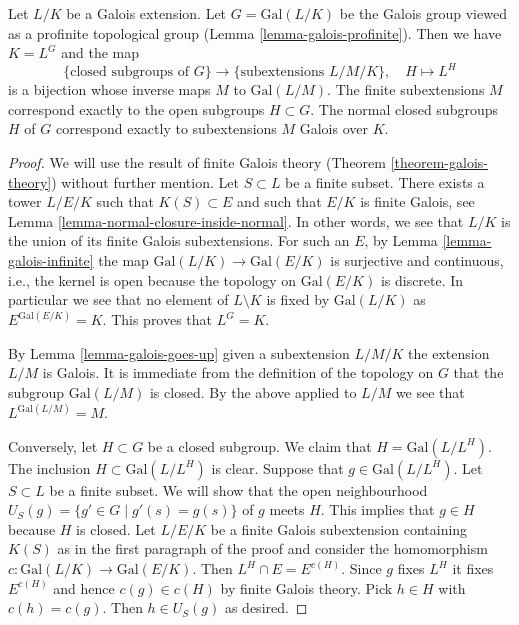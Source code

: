 \begin{theorem}
\label{theorem-inifinite-galois-theory}
Let $L/K$ be a Galois extension. Let $G = \text{Gal}(L/K)$
be the Galois group viewed as a profinite topological group
(Lemma \ref{lemma-galois-profinite}). Then we have $K = L^G$ and the map
$$
\{\text{closed subgroups of }G\}
\longrightarrow
\{\text{subextensions }L/M/K\},\quad
H \longmapsto L^H
$$
is a bijection whose inverse maps $M$ to $\text{Gal}(L/M)$.
The finite subextensions $M$ correspond exactly to the open
subgroups $H \subset G$. The normal closed subgroups $H$ of $G$
correspond exactly to subextensions $M$ Galois over $K$.
\end{theorem}

\begin{proof}
We will use the result of finite Galois theory
(Theorem \ref{theorem-galois-theory})
without further mention.
Let $S \subset L$ be a finite subset. There exists a tower
$L/E/K$ such that $K(S) \subset E$ and such that
$E/K$ is finite Galois, see Lemma \ref{lemma-normal-closure-inside-normal}.
In other words, we see that $L/K$ is the union of its finite
Galois subextensions.
For such an $E$, by Lemma \ref{lemma-galois-infinite}
the map $\text{Gal}(L/K) \to \text{Gal}(E/K)$ is surjective
and continuous, i.e., the kernel is open because the topology
on $\text{Gal}(E/K)$ is discrete.
In particular we see that no element of $L \setminus K$ is fixed by
$\text{Gal}(L/K)$ as $E^{\text{Gal}(E/K)} = K$.
This proves that $L^G = K$.

\medskip\noindent
By Lemma \ref{lemma-galois-goes-up} given a subextension $L/M/K$
the extension $L/M$ is Galois. It is immediate from the definition
of the topology on $G$ that the subgroup $\text{Gal}(L/M)$ is closed.
By the above applied to $L/M$ we see that $L^{\text{Gal}(L/M)} = M$.

\medskip\noindent
Conversely, let $H \subset G$ be a closed subgroup. We claim that
$H = \text{Gal}(L/L^H)$. The inclusion $H \subset \text{Gal}(L/L^H)$
is clear. Suppose that $g \in \text{Gal}(L/L^H)$. Let $S \subset L$
be a finite subset. We will show that the open neighbourhood
$U_S(g) = \{g' \in G \mid g'(s) = g(s)\}$ of $g$ meets $H$.
This implies that $g \in H$ because $H$ is closed.
Let $L/E/K$ be a finite Galois subextension containing $K(S)$
as in the first paragraph of the proof and consider the homomorphism
$c : \text{Gal}(L/K) \to \text{Gal}(E/K)$.
Then $L^H \cap E = E^{c(H)}$. Since $g$ fixes $L^H$ it fixes
$E^{c(H)}$ and hence $c(g) \in c(H)$ by finite Galois theory.
Pick $h \in H$ with $c(h) = c(g)$. Then $h \in U_S(g)$ as desired.


\end{proof}
